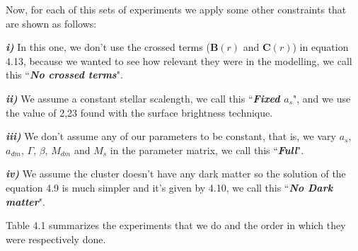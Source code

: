 Now, for each of this sets of experiments we apply some other constraints that are shown as follows: 

\textbf{\textit{i)}} In this one, we don't use the crossed terms ($\mathbf{B}(r)$ and $\mathbf{C}(r)$) in equation 4.13, because we wanted to see how relevant they were in the modelling, we call this ``\textbf{\textit{No crossed terms}}". 

\textbf{\textit{ii)}} We assume a constant stellar scalength, we call this ``\textbf{\textit{Fixed $a_{s}$}}", and we use the value of 2,23 found with the surface brightness technique. 

\textbf{\textit{iii)}} We don't assume any of our parameters to be constant, that is, we vary $a_{s}$, $a_{dm}$, $\Gamma$, $\beta$, $M_{dm}$ and $M_{s}$ in the parameter matrix, we call this ``\textbf{\textit{Full}}". 

\textbf{\textit{iv)}} We assume the cluster doesn't have any dark matter so the solution of the equation 4.9 is much simpler and it's given by 4.10, we call this ``\textbf{\textit{No Dark matter}}".

Table 4.1 summarizes the experiments that we do and the order in which they were respectively done.

